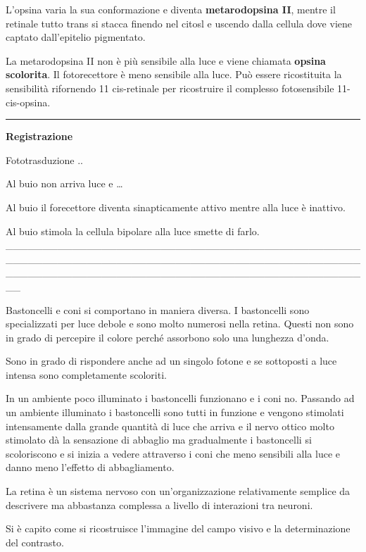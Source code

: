 \documentclass[]{article}
\begin{document}
L'opsina varia la sua conformazione e diventa \textbf{metarodopsina II},
mentre il retinale tutto trans si stacca finendo nel citosl e uscendo
dalla cellula dove viene captato dall'epitelio pigmentato.

La metarodopsina II non è più sensibile alla luce e viene chiamata
\textbf{opsina scolorita}. Il fotorecettore è meno sensibile alla luce.
Può essere ricostituita la sensibilità rifornendo 11 cis-retinale per
ricostruire il complesso fotosensibile 11-cis-opsina.

\begin{center}\rule{0.5\linewidth}{\linethickness}\end{center}

\textbf{Registrazione}

Fototrasduzione ..

Al buio non arriva luce e \ldots{}

Al buio il forecettore diventa sinapticamente attivo mentre alla luce è
inattivo.

Al buio stimola la cellula bipolare alla luce smette di farlo.
\_\_\_\_\_\_\_\_\_\_\_\_\_\_\_\_\_\_\_\_\_\_\_\_\_\_\_\_\_\_\_\_\_\_\_\_\_\_\_\_\_\_\_\_\_\_\_\_\_\_\_\_\_\_\_\_\_\_\_\_\_\_\_\_\_\_\_\_\_\_\_\_\_\_\_\_\_\_\_\_\_\_\_\_\_\_\_\_\_\_\_\_\_\_\_\_\_\_\_\_\_\_\_\_\_\_\_\_\_\_\_\_\_\_\_\_\_\_\_\_\_\_\_\_\_\_\_\_\_\_\_\_\_\_\_\_\_\_\_\_\_\_\_\_\_\_

Bastoncelli e coni si comportano in maniera diversa. I bastoncelli sono
specializzati per luce debole e sono molto numerosi nella retina. Questi
non sono in grado di percepire il colore perché assorbono solo una
lunghezza d'onda.

Sono in grado di rispondere anche ad un singolo fotone e se sottoposti a
luce intensa sono completamente scoloriti.

In un ambiente poco illuminato i bastoncelli funzionano e i coni no.
Passando ad un ambiente illuminato i bastoncelli sono tutti in funzione
e vengono stimolati intensamente dalla grande quantità di luce che
arriva e il nervo ottico molto stimolato dà la sensazione di abbaglio ma
gradualmente i bastoncelli si scoloriscono e si inizia a vedere
attraverso i coni che meno sensibili alla luce e danno meno l'effetto di
abbagliamento.

La retina è un sistema nervoso con un'organizzazione relativamente
semplice da descrivere ma abbastanza complessa a livello di interazioni
tra neuroni.

Si è capito come si ricostruisce l'immagine del campo visivo e la
determinazione del contrasto.
\end{document}
